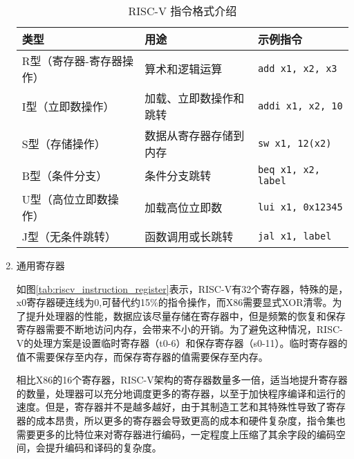 \begin{enumerate}[label={(\arabic*)},itemsep=0pt, parsep=0pt]
	      \begin{table}[htbp]
		      \centering
		      \caption{RISC-V 指令格式介绍}
		      \begin{tabularx}{\textwidth}{>{\centering\arraybackslash}X >{\centering\arraybackslash}X >{\centering\arraybackslash}X}
			      \toprule
			      \textbf{类型}   & \textbf{用途} & \textbf{示例指令}              \\
			      \midrule
			      R型（寄存器-寄存器操作） & 算术和逻辑运算     & \texttt{add x1, x2, x3}    \\
			      I型（立即数操作）     & 加载、立即数操作和跳转 & \texttt{addi x1, x2, 10}   \\
			      S型（存储操作）      & 数据从寄存器存储到内存 & \texttt{sw x1, 12(x2)}     \\
			      B型（条件分支）      & 条件分支跳转      & \texttt{beq x1, x2, label} \\
			      U型（高位立即数操作）   & 加载高位立即数     & \texttt{lui x1, 0x12345}   \\
			      J型（无条件跳转）     & 函数调用或长跳转    & \texttt{jal x1, label}     \\
			      \bottomrule
		      \end{tabularx}
		      \label{tab:riscv_instruction_formats}
	      \end{table}

	\item 通用寄存器

	      如图\ref{tab:riscv_instruction_register}表示，RISC-V有32个寄存器，特殊的是，x0寄存器硬连线为0,可替代约15\%的指令操作，而X86需要显式XOR清零。为了提升处理器的性能，数据应该尽量存储在寄存器中，但是频繁的恢复和保存寄存器需要不断地访问内存，会带来不小的开销。为了避免这种情况，RISC-V的处理方案是设置临时寄存器（t0-6）和保存寄存器（s0-11）。临时寄存器的值不需要保存至内存，而保存寄存器的值需要保存至内存。

	      相比X86的16个寄存器，RISC-V架构的寄存器数量多一倍，适当地提升寄存器的数量，处理器可以充分地调度更多的寄存器，以至于加快程序编译和运行的速度。但是，寄存器并不是越多越好，由于其制造工艺和其特殊性导致了寄存器的成本昂贵，所以更多的寄存器会导致更高的成本和硬件复杂度，指令集也需要更多的比特位来对寄存器进行编码，一定程度上压缩了其余字段的编码空间，会提升编码和译码的复杂度。


\end{enumerate}
